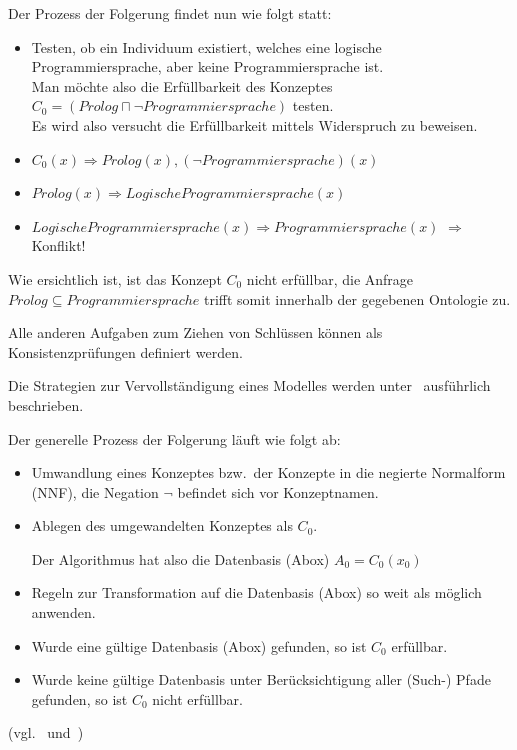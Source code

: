 Der Prozess der Folgerung findet nun wie folgt statt:
\begin{itemize}
    \item Testen, ob ein Individuum existiert, welches eine logische Programmiersprache, aber keine Programmiersprache ist.\\
        Man möchte also die Erfüllbarkeit des Konzeptes $ C_0 = (Prolog \sqcap \neg Programmiersprache) $ testen.\\
        Es wird also versucht die Erfüllbarkeit mittels Widerspruch zu beweisen.
    \item $ C_0(x) \Rightarrow Prolog(x), (\neg Programmiersprache)(x) $
    \item $ Prolog(x) \Rightarrow LogischeProgrammiersprache(x) $
    \item $ LogischeProgrammiersprache(x) \Rightarrow Programmiersprache(x) $
        $ \Rightarrow $ Konflikt!
\end{itemize}
Wie ersichtlich ist, ist das Konzept $ C_0 $ nicht erfüllbar, die Anfrage $ Prolog \subseteq Programmiersprache $ trifft somit innerhalb der gegebenen Ontologie zu.

Alle anderen Aufgaben zum Ziehen von Schlüssen können als Konsistenzprüfungen definiert werden.

Die Strategien zur Vervollständigung eines Modelles werden unter~\cite[Seiten 7 bis 9]{sirin:pellet05} ausführlich beschrieben.





Der generelle Prozess der Folgerung läuft wie folgt ab:
\begin{itemize}
    \item Umwandlung eines Konzeptes bzw.\ der Konzepte in die negierte Normalform (NNF), die Negation $ \neg $ befindet sich vor Konzeptnamen.
    \item Ablegen des umgewandelten Konzeptes als $ C_0 $.

        Der Algorithmus hat also die Datenbasis (Abox) $ A_0 = {C_0(x_0)} $
    \item Regeln zur Transformation auf die Datenbasis (Abox) so weit als möglich anwenden.
    \item Wurde eine gültige Datenbasis (Abox) gefunden, so ist $ C_0 $ erfüllbar.
    \item Wurde keine gültige Datenbasis unter Berücksichtigung aller (Such-) Pfade gefunden, so ist $ C_0 $ nicht erfüllbar.
\end{itemize} (vgl.~\cite{horrocks2002} und~\cite{horrocks2005})

